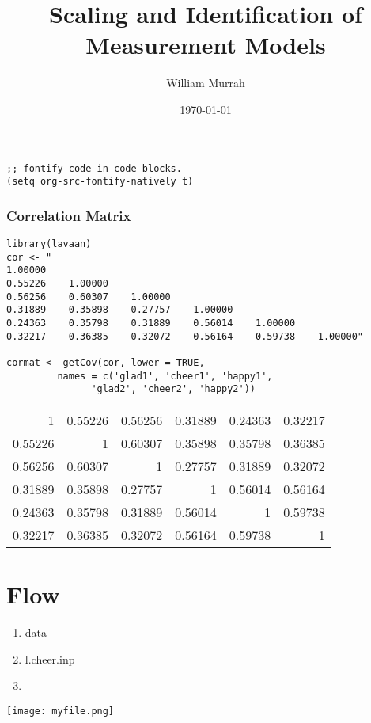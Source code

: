 \documentclass{article}
\author{William Murrah}
\date{\today}
\title{Scaling and Identification of Measurement Models}
\begin{document}
\maketitle
\tableofcontents

\begin{verbatim}
;; fontify code in code blocks.
(setq org-src-fontify-natively t)
\end{verbatim}


\subsubsection{Correlation Matrix}
\label{sec:orgheadline1}
\begin{verbatim}
library(lavaan)
cor <- "
1.00000
0.55226    1.00000
0.56256    0.60307    1.00000
0.31889    0.35898    0.27757    1.00000
0.24363    0.35798    0.31889    0.56014    1.00000
0.32217    0.36385    0.32072    0.56164    0.59738    1.00000"

cormat <- getCov(cor, lower = TRUE, 
		 names = c('glad1', 'cheer1', 'happy1',
			   'glad2', 'cheer2', 'happy2'))
\end{verbatim}


\begin{center}
\begin{tabular}{rrrrrr}
1 & 0.55226 & 0.56256 & 0.31889 & 0.24363 & 0.32217\\
0.55226 & 1 & 0.60307 & 0.35898 & 0.35798 & 0.36385\\
0.56256 & 0.60307 & 1 & 0.27757 & 0.31889 & 0.32072\\
0.31889 & 0.35898 & 0.27757 & 1 & 0.56014 & 0.56164\\
0.24363 & 0.35798 & 0.31889 & 0.56014 & 1 & 0.59738\\
0.32217 & 0.36385 & 0.32072 & 0.56164 & 0.59738 & 1\\
\end{tabular}
\end{center}


\section{Flow}
\label{sec:orgheadline2}
\begin{enumerate}
\item data
\item l.cheer.inp
\item 
\end{enumerate}


\texttt{[image: myfile.png]}
\end{document}
